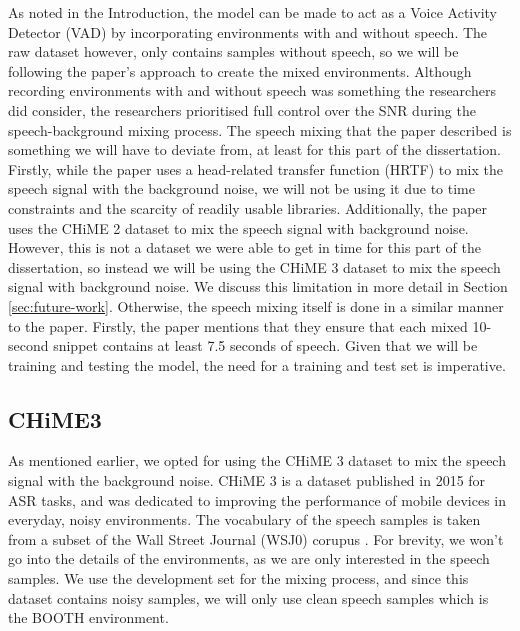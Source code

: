 \documentclass[logo,bsc,singlespacing,parskip,online]{infthesis}
\begin{document}
As noted in the Introduction, the model can be made to act as a Voice Activity Detector (VAD) by incorporating environments with and without speech.
The raw dataset however, only contains samples without speech, so we will be following the paper's approach to create the mixed environments.
Although recording environments with and without speech was something the researchers did consider, the researchers prioritised full control over the SNR during the speech-background mixing process.
The speech mixing that the paper described is something we 
will have to deviate from, at least for this part of the dissertation.
Firstly, while the paper uses a head-related transfer function (HRTF) to mix the speech signal with the background noise,
we will not be using it due to time constraints and the scarcity of readily usable libraries.
Additionally, the paper uses the CHiME 2 dataset \citep{vincent_second_2013} to mix the speech signal with background noise.
However, this is not a dataset we were able to get in time for this part 
of the dissertation, so instead we will be using the CHiME 3 dataset \citep{barker_third_2015} to mix the speech signal with background noise.
We discuss this limitation in more detail in Section \ref{sec:future-work}.
Otherwise, the speech mixing itself is done in a similar manner to the paper.
Firstly, the paper mentions that they ensure that each mixed 10-second snippet contains at least 7.5 seconds of speech.
Given that we will be training and testing the model, the need for a training and test set is imperative. 

\subsection{CHiME3}
 As mentioned earlier, we opted for using the CHiME 3 dataset to mix the speech signal with the background noise. 
CHiME 3 is a dataset published in 2015 for ASR tasks, and was dedicated to improving the performance of mobile devices 
in everyday, noisy environments. The vocabulary of the speech samples is taken from a subset of the Wall Street Journal (WSJ0) corupus \cite{TODO}.
For brevity, we won't go into the details of the environments, as we 
are only interested in the speech samples. 
We use the development set for the mixing process,
and since this dataset contains noisy samples, we will only use clean speech samples 
which is the BOOTH environment.
\end{document}
